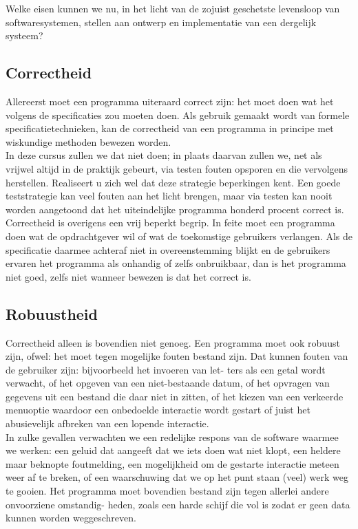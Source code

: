 \documentclass{article}
\begin{document}
	Welke eisen kunnen we nu, in het licht van de zojuist geschetste levensloop van softwaresystemen, stellen aan ontwerp en implementatie van
	een dergelijk systeem?
	
	\subsection{Correctheid}
	
	Allereerst moet een programma uiteraard correct zijn: het moet doen
	wat het volgens de specificaties zou moeten doen. Als gebruik gemaakt
	wordt van formele specificatietechnieken, kan de correctheid van een
	programma in principe met wiskundige methoden bewezen worden. \\
	In deze cursus zullen we dat niet doen; in plaats daarvan zullen we, net
	als vrijwel altijd in de praktijk gebeurt, via testen fouten opsporen en die
	vervolgens herstellen. Realiseert u zich wel dat deze strategie beperkingen
	kent. Een goede teststrategie kan veel fouten aan het licht brengen, maar
	via testen kan nooit worden aangetoond dat het uiteindelijke programma
	honderd procent correct is. \\
	Correctheid is overigens een vrij beperkt begrip. In feite moet een
	programma doen wat de opdrachtgever wil of wat de toekomstige
	gebruikers verlangen. Als de specificatie daarmee achteraf niet in
	overeenstemming blijkt en de gebruikers ervaren het programma als
	onhandig of zelfs onbruikbaar, dan is het programma niet goed, zelfs
	niet wanneer bewezen is dat het correct is. \\
	\newpage
	\subsection{Robuustheid}
	
	Correctheid alleen is bovendien niet genoeg. Een programma moet ook
	robuust zijn, ofwel: het moet tegen mogelijke fouten bestand zijn. Dat
	kunnen fouten van de gebruiker zijn: bijvoorbeeld het invoeren van let-
	ters als een getal wordt verwacht, of het opgeven van een niet-bestaande
	datum, of het opvragen van gegevens uit een bestand die daar niet in
	zitten, of het kiezen van een verkeerde menuoptie waardoor een onbedoelde interactie wordt gestart of juist het abusievelijk afbreken van een
	lopende interactie. \\
	In zulke gevallen verwachten we een redelijke respons van de software
	waarmee we werken: een geluid dat aangeeft dat we iets doen wat niet
	klopt, een heldere maar beknopte foutmelding, een mogelijkheid om de
	gestarte interactie meteen weer af te breken, of een waarschuwing dat
	we op het punt staan (veel) werk weg te gooien. Het programma moet
	bovendien bestand zijn tegen allerlei andere onvoorziene omstandig-
	heden, zoals een harde schijf die vol is zodat er geen data kunnen
	worden weggeschreven. \\
	
\end{document}

